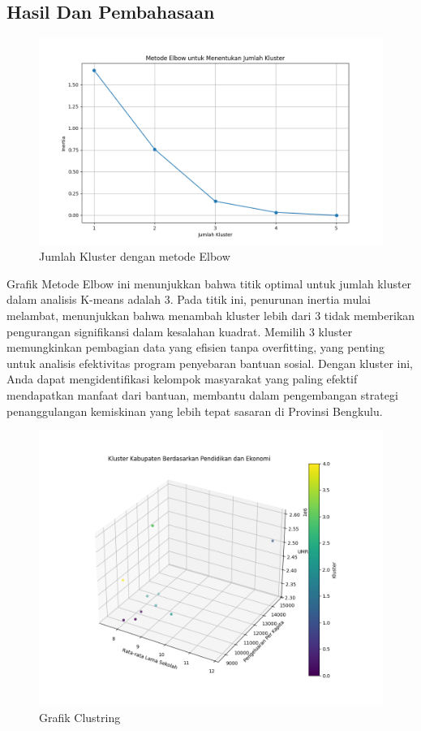 \documentclass[12pt,a4paper]{article}
\begin{document}
\begin{multicols}{2}
\section{Hasil Dan Pembahasaan}

\begin{figure}[H]
    \centering
    \includegraphics[width=0.7\linewidth]{images/elbow.png}
    \caption{Jumlah Kluster dengan metode Elbow}
    \label{fig:placeholder}
\end{figure}

Grafik Metode Elbow ini menunjukkan bahwa titik optimal untuk jumlah kluster dalam analisis K-means adalah 3. Pada titik ini, penurunan inertia mulai melambat, menunjukkan bahwa menambah kluster lebih dari 3 tidak memberikan pengurangan signifikansi dalam kesalahan kuadrat. Memilih 3 kluster memungkinkan pembagian data yang efisien tanpa overfitting, yang penting untuk analisis efektivitas program penyebaran bantuan sosial. Dengan kluster ini, Anda dapat mengidentifikasi kelompok masyarakat yang paling efektif mendapatkan manfaat dari bantuan, membantu dalam pengembangan strategi penanggulangan kemiskinan yang lebih tepat sasaran di Provinsi Bengkulu.

\begin{figure}[H]
    \centering
    \includegraphics[width=0.7\linewidth]{images/hasil_kluster.png}
    \caption{Grafik Clustring }
    \label{fig:clustring}
\end{figure}


\end{multicols}
\end{document}
